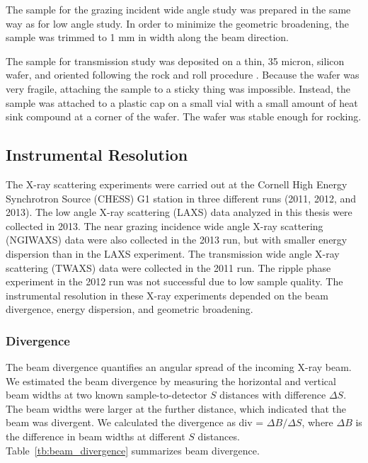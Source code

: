 The sample for the grazing incident wide angle study was prepared in the same way 
as for low angle study. In order to minimize the geometric broadening, the 
sample was trimmed to 1 mm in width along the beam direction.

The sample for transmission study was deposited on a thin, 35 micron, silicon
wafer, and oriented following the rock and roll procedure \cite{Tristram-Nagle07_MMB}.  
Because the wafer was very fragile, attaching the sample to a sticky 
thing was impossible. Instead, the sample was attached to a plastic cap on 
a small vial with a small amount of heat sink compound at a corner of the 
wafer. The wafer was stable enough for rocking. 

\subsection{Instrumental Resolution}\label{sec:instrumental_resolution}
The X-ray scattering experiments were carried out at the Cornell 
High Energy Synchrotron Source (CHESS) G1 station in three different runs
(2011, 2012, and 2013). 
The low angle X-ray scattering (LAXS) data analyzed 
in this thesis were collected in 2013.
The near grazing incidence wide angle X-ray scattering (NGIWAXS) data were also collected
in the 2013 run, but with smaller energy dispersion than in the LAXS experiment.
The transmission wide angle X-ray scattering (TWAXS) data were collected
in the 2011 run. The ripple phase experiment in the 2012 run was not successful
due to low sample quality.
The instrumental resolution in these X-ray experiments depended on the beam
divergence, energy dispersion, and geometric broadening. 

\subsubsection{Divergence}
The beam divergence quantifies an angular spread of the incoming X-ray
beam. We estimated the beam divergence by measuring the horizontal and 
vertical beam widths at two known sample-to-detector $S$ distances
with difference $\Delta S$. 
The beam widths were larger at the further distance, which indicated 
that the beam was divergent. 
We calculated the divergence as div = $\Delta B/\Delta S$, where
$\Delta B$ is the difference in beam widths at different $S$ distances.
Table~\ref{tb:beam_divergence} summarizes beam divergence.


